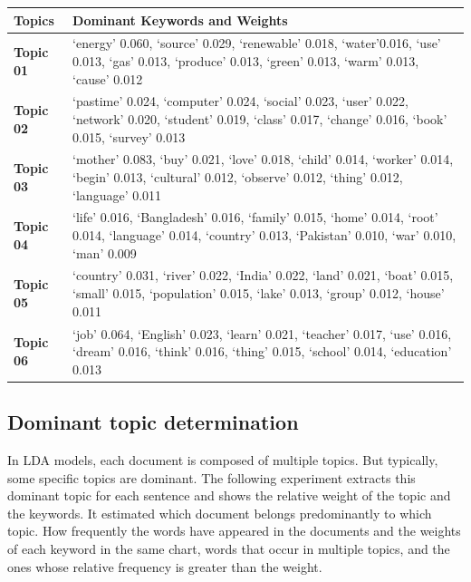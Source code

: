 \documentclass[sn-mathphys,Numbered]{sn-jnl}%
\theoremstyle{thmstyleone}%
\theoremstyle{thmstyletwo}%
\theoremstyle{thmstylethree}%
\begin{document}
\begin{longtable}[]{@{}
  >{\raggedright\arraybackslash}p{}     
  >{\raggedright\arraybackslash}p{}@{}}
\toprule
Topics & Dominant Keywords and Weights \\
\midrule
\endhead
\textbf{Topic 01} & \enquote*{energy} 0.060, \enquote*{source} 0.029, \enquote*{renewable} 0.018, \enquote*{water}0.016, \enquote*{use} 0.013, \enquote*{gas} 0.013, \enquote*{produce} 0.013, \enquote*{green} 0.013, \enquote*{warm}
0.013, \enquote*{cause} 0.012 
\\
\textbf{Topic 02} & \enquote*{pastime} 0.024, \enquote*{computer} 0.024, \enquote*{social} 0.023, \enquote*{user} 0.022, \enquote*{network} 0.020, \enquote*{student} 0.019, \enquote*{class} 0.017, \enquote*{change} 0.016, \enquote*{book} 0.015, \enquote*{survey} 0.013  
\\
\textbf{Topic 03 }& \enquote*{mother} 0.083, \enquote*{buy} 0.021, \enquote*{love} 0.018, \enquote*{child} 0.014, \enquote*{worker} 0.014, \enquote*{begin} 0.013, \enquote*{cultural} 0.012, \enquote*{observe} 0.012, \enquote*{thing} 0.012, \enquote*{language} 0.011 
\\ 
\textbf{Topic 04} &  \enquote*{life} 0.016, \enquote*{Bangladesh} 0.016, \enquote*{family} 0.015, \enquote*{home} 0.014, \enquote*{root} 0.014, \enquote*{language} 0.014, \enquote*{country} 0.013, \enquote*{Pakistan} 0.010, \enquote*{war} 0.010, \enquote*{man} 0.009 
\\ 
\textbf{Topic 05} & \enquote*{country} 0.031, \enquote*{river} 0.022, \enquote*{India} 0.022, \enquote*{land} 0.021, \enquote*{boat} 0.015, \enquote*{small} 0.015, \enquote*{population} 0.015, \enquote*{lake} 0.013, \enquote*{group} 0.012, \enquote*{house} 0.011 
\\ 
\textbf{Topic 06} & \enquote*{job} 0.064, \enquote*{English} 0.023, \enquote*{learn} 0.021, \enquote*{teacher} 0.017, \enquote*{use} 0.016, \enquote*{dream} 0.016, \enquote*{think} 0.016, \enquote*{thing} 0.015, \enquote*{school} 0.014, \enquote*{education} 0.013\\
\bottomrule
\end{longtable}


\subsection{Dominant topic determination}\label{dom_topic}

In LDA models, each document is composed of multiple topics. But typically, some specific topics are dominant. The following experiment extracts this dominant topic for each sentence and shows the relative weight of the topic and the keywords. It estimated which document belongs predominantly to which topic. How frequently the words have appeared in the documents and the weights of each keyword in the same chart, words that occur in multiple topics, and the ones whose relative frequency is greater than the weight.\\
\end{document}
